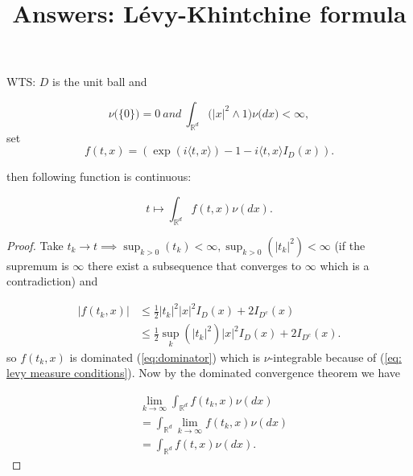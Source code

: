 \documentclass[a4paper,11pt]{article}
\title{Answers: Lévy-Khintchine formula}
\begin{document}
\maketitle
\date{}

\section{}
WTS: $D$ is the unit ball and

\begin{equation} \label{eq: levy measure conditions}
    \nu\big( \{0 \} \big)=0 \ a n d \ \int_{\mathbb{R}^{d}} ( | x |^{2} \wedge1 \big) \nu\big( d x \big) < \infty,
\end{equation}
set
\begin{equation}
    f(t,x) =  ( \operatorname{e x p} ( i \langle t, x \rangle)-1-i \langle t, x \rangle I_{D} ( x ) )
    .
\end{equation}

then following function is continuous:

\begin{equation}
    t \mapsto\int_{\mathbb{R}^{d}} f(t,x)\nu( d x )
    .
\end{equation}

\begin{proof}
    Take $t_{k} \rightarrow t \implies \sup_{k>0}(t_{k})<\infty, \sup_{k>0}(|t_{k}|^{2})<\infty $
    (if the supremum is $\infty$ there exist a subsequence that converges to $\infty$ which is a contradiction) and

    \begin{align}
        |f(t_{k},x)| & \le \frac{1}{2} |t_{k}|^{2} |x|^{2} I_{D}(x) + 2 I_{D^{c}}(x)                                              \\
                     & \le \frac{1}{2} \sup_{k}\left(|t_{k}|^{2}  \right)  |x|^{2} I_{D}(x) + 2 I_{D^{c}}(x) \label{eq:dominator}
        .
    \end{align}
    so $f(t_{k},x)$ is dominated (\ref{eq:dominator}) which is $\nu$-integrable because of (\ref{eq: levy measure conditions}).
    Now by the dominated convergence theorem we have

    \begin{align}
         & \lim_{k \rightarrow \infty} {\int_{\mathbb{R}^{d}} f(t_{k},x)\nu( d x )}   \\
         & =  \int_{\mathbb{R}^{d}} \lim_{k \rightarrow \infty}{f(t_{k},x)\nu( d x )} \\
         & =  \int_{\mathbb{R}^{d}} {f(t,x)\nu( d x )}
        .
    \end{align}

\end{proof}
\end{document}
